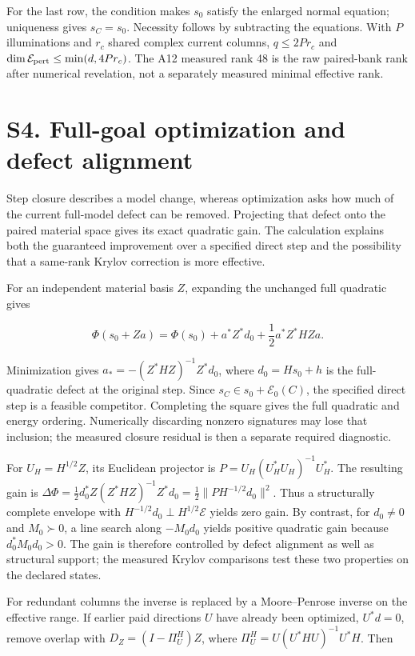 \documentclass[11pt]{article}
\begin{document}
For the last row, the condition makes \(s_0\) satisfy the enlarged normal equation; uniqueness gives \(s_C=s_0\). Necessity follows by subtracting the equations. With \(P\) illuminations and \(r_c\) shared complex current columns, \(q\le2Pr_c\) and \(\dim\mathcal E_{\rm pert}\le\min(d,4Pr_c)\). The A12 measured rank 48 is the raw paired-bank rank after numerical revelation, not a separately measured minimal effective rank.

\section*{S4. Full-goal optimization and defect alignment}

Step closure describes a model change, whereas optimization asks how much of the current full-model defect can be removed. Projecting that defect onto the paired material space gives its exact quadratic gain. The calculation explains both the guaranteed improvement over a specified direct step and the possibility that a same-rank Krylov correction is more effective.

For an independent material basis \(Z\), expanding the unchanged full quadratic gives

\[
\Phi(s_0+Za)=\Phi(s_0)+a^*Z^*d_0+\frac12a^*Z^*HZa.
\]

Minimization gives \(a_*=- (Z^*HZ)^{-1}Z^*d_0\), where \(d_0=Hs_0+h\) is the full-quadratic defect at the original step. Since \(s_C\in s_0+\mathcal E_0(C)\), the specified direct step is a feasible competitor. Completing the square gives the full quadratic and energy ordering. Numerically discarding nonzero signatures may lose that inclusion; the measured closure residual is then a separate required diagnostic.

For \(U_H=H^{1/2}Z\), its Euclidean projector is \(P=U_H(U_H^*U_H)^{-1}U_H^*\). The resulting gain is \(\Delta\Phi=\tfrac12d_0^*Z(Z^*HZ)^{-1}Z^*d_0=\tfrac12\|PH^{-1/2}d_0\|^2\). Thus a structurally complete envelope with \(H^{-1/2}d_0\perp H^{1/2}\mathcal E\) yields zero gain. By contrast, for \(d_0\ne0\) and \(M_0\succ0\), a line search along \(-M_0d_0\) yields positive quadratic gain because \(d_0^*M_0d_0>0\). The gain is therefore controlled by defect alignment as well as structural support; the measured Krylov comparisons test these two properties on the declared states.

For redundant columns the inverse is replaced by a Moore--Penrose inverse on the effective range. If earlier paid directions \(U\) have already been optimized, \(U^*d=0\), remove overlap with \(D_Z=(I-\Pi_U^H)Z\), where \(\Pi_U^H=U(U^*HU)^{-1}U^*H\). Then
\end{document}
